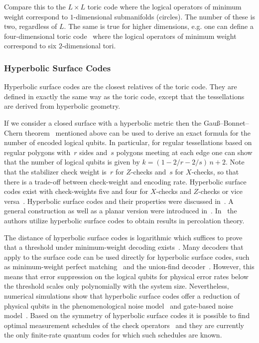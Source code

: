 \documentclass[amsmath, amssymb, floatfix, reprint, twocolumn, notitlepage, 10pt]{revtex4-1}
\newcommand{\change}{}
\begin{document}
Compare this to the $L\times L$ toric code where the logical operators of minimum weight correspond to $1$-dimensional submanifolds (circles).
The number of these is two, regardless of $L$.
The same is true for higher dimensions, e.g. one can define a four-dimensional toric code~\cite{dennis2002topological} where the logical operators of minimum weight correspond to six $2$-dimensional tori.

\subsubsection{Hyperbolic Surface Codes}\label{sec:hyperbolicsurfacecodes}
Hyperbolic surface codes are the closest relatives of the toric code.
They are defined in exactly the same way as the toric code, except that the tessellations are derived from hyperbolic geometry.

If we consider a closed surface with a hyperbolic metric then the Gau\ss --Bonnet--Chern theorem~\cite{nakahara2003geometry} mentioned above can be used to derive an exact formula for the number of encoded logical qubits.
In particular, for regular tessellations based on regular polygons with~$r$ sides and~$s$ polygons meeting at each edge one can show that the number of logical qubits is given by $k = (1-2/r-2/s)\, n + 2$.
Note that the stabilizer check weight is~$r$ for $Z$-checks and~$s$ for $X$-checks, so that there is a trade-off between check-weight and encoding rate.
Hyperbolic surface codes exist with check-weights five and four for $X$-checks and $Z$-checks or vice versa~\cite{breuckmann2016constructions,breuckmann2017hyperbolic}.
Hyperbolic surface codes and their properties were discussed in~\cite{kim2007quantum,zemor2009cayley,delfosse2013tradeoffs}.
A general construction as well as a planar version were introduced in~\cite{breuckmann2016constructions}.
{\change In~\cite{delfosse2012upper} the authors utilize hyperbolic surface codes to obtain results in percolation theory.}

The distance of hyperbolic surface codes is logarithmic which suffices to prove that a threshold under minimum-weight decoding exists~\cite{kovalev2013fault}.
Many decoders that apply to the surface code can be used directly for hyperbolic surface codes, such as minimum-weight perfect matching~\cite{breuckmann2016constructions} and the union-find decoder~\cite{delfosse2017almost}.
However, this means that error suppression on the logical qubits for physical error rates below the threshold scales only polynomially with the system size.
Nevertheless, numerical simulations show that hyperbolic surface codes offer a reduction of physical qubits in the phenomenological noise model~\cite{breuckmann2016constructions,breuckmann2017hyperbolic} and gate-based noise model~\cite{higgott2020subsystem}.
Based on the symmetry of hyperbolic surface codes it is possible to find optimal measurement schedules of the check operators~\cite{higgott2020subsystem} and they are currently the only finite-rate quantum codes for which such schedules are known.
\end{document}
